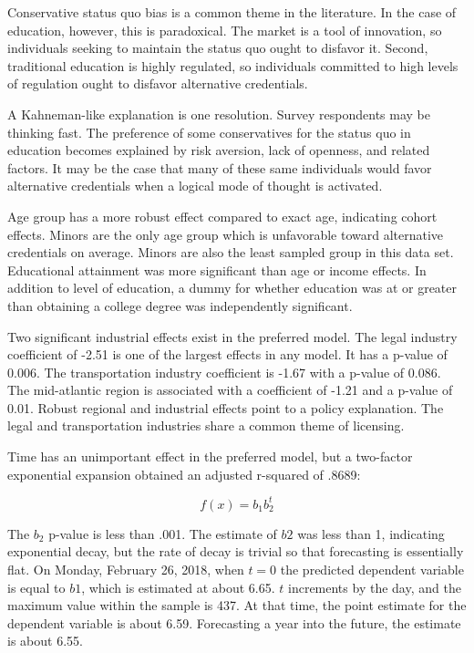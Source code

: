 \documentclass[AER]{./aea-latex-templates/AEA}
\begin{document}
        Conservative status quo bias is a common theme in the literature\cite{eidelman2012bias}.
        In the case of education, however, this is paradoxical.
        The market is a tool of innovation\cite{baumol2002free},
        so individuals seeking to maintain the status quo ought to disfavor it.
        Second, traditional education is highly regulated,
        so individuals committed to high levels of regulation ought to disfavor
        alternative credentials.

        A Kahneman-like explanation is one resolution.
        Survey respondents may be thinking fast\cite{kahneman2011thinking}.
        The preference of some conservatives for the status quo in education becomes explained by
        risk aversion, lack of openness, and related factors.
        It may be the case that many of these same individuals would favor alternative
        credentials when a logical mode of thought is activated.
        
        Age group has a more robust effect compared to exact age, indicating cohort effects.
        Minors are the only age group which is unfavorable toward alternative credentials on average.
        Minors are also the least sampled group in this data set.
        Educational attainment was more significant than age or income effects.
        In addition to level of education, a dummy for whether education was at or greater than
        obtaining a college degree was independently significant.
        
        Two significant industrial effects exist in the preferred model.
        The legal industry coefficient of -2.51 is one of the largest effects in any model.
        It has a p-value of 0.006.
        The transportation industry coefficient is -1.67 with a p-value of 0.086.
        The mid-atlantic region is associated with a coefficient of -1.21 and a p-value of 0.01.
        Robust regional and industrial effects point to a policy explanation.
        The legal and transportation industries share a common theme of licensing.
        
        Time has an unimportant effect in the preferred model,
        but a two-factor exponential expansion obtained an adjusted r-squared of .8689:
        
        \begin{equation} f(x) = b_1b_2^t \end{equation}
        
        The $b_2$ p-value is less than .001. The estimate of $b2$ was less than 1, indicating exponential
        decay, but the rate of decay is trivial so that forecasting is essentially flat.
        On Monday, February 26, 2018, when $t=0$ the predicted dependent variable is equal to $b1$, which is estimated at about 6.65.
        $t$ increments by the day, and the maximum value within the sample is 437. At that time, the point estimate
        for the dependent variable is about 6.59. Forecasting a year into the future, the estimate is about 6.55.
        
\end{document}

